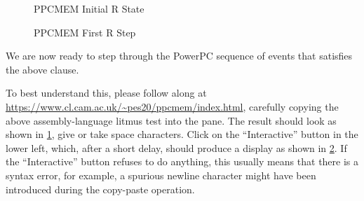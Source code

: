 \begin{figure}[tbp]
\centering
{}
\caption{PPCMEM Initial R State}
\label{fig:memorder:PPCMEM Initial R State}
\end{figure}

\begin{figure}[tbp]
\centering
{}
\caption{PPCMEM First R Step}
\label{fig:memorder:PPCMEM First R Step}
\end{figure}

We are now ready to step through the PowerPC sequence of events that
satisfies the above  clause.

To best understand this, please follow along at
\url{https://www.cl.cam.ac.uk/~pes20/ppcmem/index.html},
carefully copying the above assembly-language litmus test into the pane.
The result should look as shown in
\cref{fig:memorder:PPCMEM Initial R State}, give or take space characters.
Click on the ``Interactive'' button in the lower left, which, after a
short delay, should produce a display as shown in
\cref{fig:memorder:PPCMEM First R Step}.
If the ``Interactive'' button refuses to do anything, this usually means
that there is a syntax error, for example, a spurious newline character
might have been introduced during the copy-paste operation.

